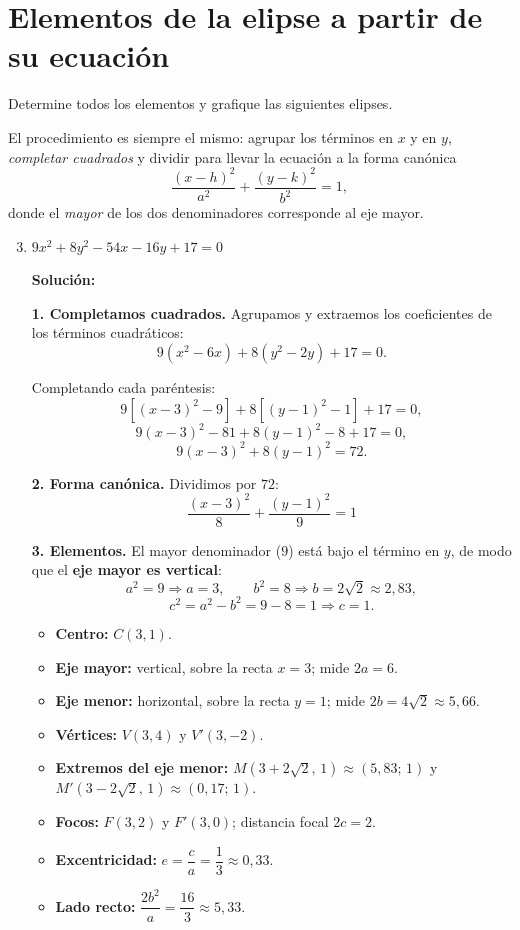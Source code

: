 \documentclass[12pt]{article}
\newcommand{\solucion}{%
    \vspace{0.8em}%
    \textbf{Solución:}%
    \vspace{0.8em}%
}
\begin{document}
\section{Elementos de la elipse a partir de su ecuación}

Determine todos los elementos y grafique las siguientes elipses.

\vspace{0.5em}
El procedimiento es siempre el mismo: agrupar los términos en $x$ y en $y$,
\emph{completar cuadrados} y dividir para llevar la ecuación a la forma
canónica
\[
\frac{(x-h)^{2}}{a^{2}}+\frac{(y-k)^{2}}{b^{2}}=1 ,
\]
donde el \emph{mayor} de los dos denominadores corresponde al eje mayor.

\begin{enumerate}[label=\alph*.-]

    \setcounter{enumi}{2} %

    \item $9x^{2}+8y^{2}-54x-16y+17=0$

    \solucion

    \textbf{1. Completamos cuadrados.} Agrupamos y extraemos los coeficientes
    de los términos cuadráticos:
    \[
    9\left(x^{2}-6x\right)+8\left(y^{2}-2y\right)+17=0 .
    \]

    Completando cada paréntesis:
    \[
    9\left[(x-3)^{2}-9\right]+8\left[(y-1)^{2}-1\right]+17=0 ,
    \]
    \[
    9(x-3)^{2}-81+8(y-1)^{2}-8+17=0 ,
    \]
    \[
    9(x-3)^{2}+8(y-1)^{2}=72 .
    \]

    \textbf{2. Forma canónica.} Dividimos por $72$:
    \[
    \boxed{
    \frac{(x-3)^{2}}{8}+\frac{(y-1)^{2}}{9}=1
    }
    \]

    \textbf{3. Elementos.} El mayor denominador ($9$) está bajo el término en
    $y$, de modo que el \textbf{eje mayor es vertical}:
    \[
    a^{2}=9\Rightarrow a=3,
    \qquad
    b^{2}=8\Rightarrow b=2\sqrt2\approx 2{,}83,
    \]
    \[
    c^{2}=a^{2}-b^{2}=9-8=1\Rightarrow c=1 .
    \]

    \begin{itemize}[leftmargin=2em, itemsep=0.1em]
        \item \textbf{Centro:} $C(3,1)$.
        \item \textbf{Eje mayor:} vertical, sobre la recta $x=3$; mide
        $2a=6$.
        \item \textbf{Eje menor:} horizontal, sobre la recta $y=1$; mide
        $2b=4\sqrt2\approx 5{,}66$.
        \item \textbf{Vértices:} $V(3,4)$ y $V'(3,-2)$.
        \item \textbf{Extremos del eje menor:}
        $M(3+2\sqrt2,\,1)\approx(5{,}83;\,1)$ y
        $M'(3-2\sqrt2,\,1)\approx(0{,}17;\,1)$.
        \item \textbf{Focos:} $F(3,2)$ y $F'(3,0)$; distancia focal $2c=2$.
        \item \textbf{Excentricidad:} $e=\dfrac{c}{a}=\dfrac13\approx 0{,}33$.
        \item \textbf{Lado recto:} $\dfrac{2b^{2}}{a}=\dfrac{16}{3}
        \approx 5{,}33$.
    \end{itemize}


\end{enumerate}
\end{document}
